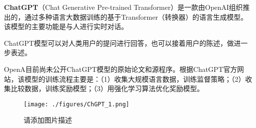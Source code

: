 
\textbf{ChatGPT}（Chat Generative Pre-trained Transformer）是一款由OpenAI组织推出的，通过多种语言大数据训练的基于Transformer（转换器）的语言生成模型。该模型的主要功能是与人进行实时对话。

ChatGPT模型可以对人类用户的提问进行回答，也可以接着用户的陈述，做进一步表述。

OpenA目前尚未公开ChatGPT模型的原始论文和源程序。根据ChatGPT官方网站，该模型的训练流程主要是：（1）收集大规模语言数据，训练监督策略；（2）收集比较数据，训练奖励模型；（3）用强化学习算法优化奖励模型。
\begin{figure}[ht]
\centering
\texttt{[image: ./figures/ChGPT\_1.png]}
\caption{请添加图片描述} \label{ChGPT_fig1}
\end{figure}